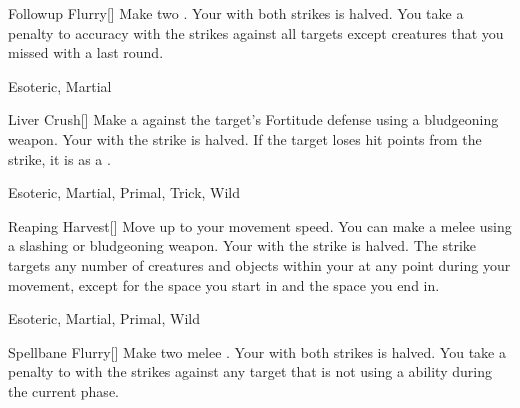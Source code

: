 \lowercase{\hypertarget{maneuver:Followup Flurry}{}}\label{maneuver:Followup Flurry}
\hypertarget{maneuver:Followup Flurry}{}
\begin{freeability}[Rank 6]{Followup Flurry}[]
Make two .
Your  with both strikes is halved.
You take a  penalty to accuracy with the strikes against all targets except creatures that you missed with a  last round.


 Esoteric, Martial
\end{freeability}
\vspace{0.25em}



\lowercase{\hypertarget{maneuver:Liver Crush}{}}\label{maneuver:Liver Crush}
\hypertarget{maneuver:Liver Crush}{}
\begin{freeability}[Rank 6]{Liver Crush}[]
Make a  against the target's Fortitude defense using a bludgeoning weapon.
Your  with the strike is halved.
If the target loses hit points from the strike, it is  as a .


 Esoteric, Martial, Primal, Trick, Wild
\end{freeability}
\vspace{0.25em}



\lowercase{\hypertarget{maneuver:Reaping Harvest}{}}\label{maneuver:Reaping Harvest}
\hypertarget{maneuver:Reaping Harvest}{}
\begin{freeability}[Rank 6]{Reaping Harvest}[]
Move up to your movement speed.
You can make a melee  using a slashing or bludgeoning weapon.
Your  with the strike is halved.
The strike targets any number of creatures and objects within your  at any point during your movement, except for the space you start in and the space you end in.


 Esoteric, Martial, Primal, Wild
\end{freeability}
\vspace{0.25em}



\lowercase{\hypertarget{maneuver:Spellbane Flurry}{}}\label{maneuver:Spellbane Flurry}
\hypertarget{maneuver:Spellbane Flurry}{}
\begin{freeability}[Rank 6]{Spellbane Flurry}[]
Make two melee .
Your  with both strikes is halved.
You take a  penalty to  with the strikes against any target that is not using a  ability during the current phase.


\end{freeability}
\vspace{0.25em}



